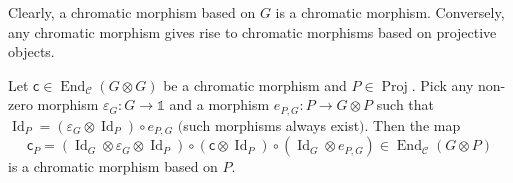 \documentclass[pdftex]{sigma}
\numberwithin{equation}{section}
\newcommand{\Proj}{\operatorname{Proj}}
\newcommand{\chr}{{\mathsf{c}}}
\numberwithin{theorem}{section}
\numberwithin{proposition}{section}
\numberwithin{definition}{section}
\numberwithin{lemma}{section}
\numberwithin{corollary}{section}
\numberwithin{remark}{section}
\numberwithin{example}{section}
\newcommand{\cat}{\mathcal{C}}
\newcommand{\End}{\operatorname{End}}
\newcommand{\unit}{\ensuremath{\mathds{1}}}
\newcommand{\Id}{\operatorname{Id}}
\newcommand{\ve}{\varepsilon}
\begin{document}
 Clearly, a chromatic morphism based on $G$ is a chromatic morphism. Conversely,
any chromatic morphism gives rise to chromatic morphisms based on
projective objects.
\begin{lemma}
 Let $\chr\in\End_\cat(G\otimes G)$ be a chromatic morphism and
 ${P\in\Proj}$. Pick any non-zero morphism $\ve_G\colon G\to\unit$ and a
 morphism ${{e}}_{P,G}\colon P\to G\otimes P$ such that
 $\Id_P=(\ve_G\otimes\Id_P)\circ{{e}}_{P,G}$ $($such morphisms always
 exist$)$. Then the map
 \begin{equation*}
 {{\chr}}_P=
 (\Id_{G}\otimes\ve_G\otimes\Id_P)\circ(\chr\otimes\Id_P)\circ(\Id_{G}\otimes{{e}}_{P,G}) \in \End_\cat(G\otimes P)
 \end{equation*}
 is a chromatic morphism based on $P$.
\end{lemma}
\end{document}
